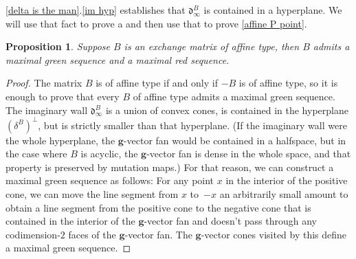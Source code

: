 \documentclass{amsart}
\newtheorem{proposition}{Proposition}[section]
\theoremstyle{definition}
\theoremstyle{remark}
\numberwithin{equation}{section}
\newcommand{\0}{{\mathbf{0}}}
\newcommand{\g}{\mathbf{g}}
\renewcommand{\d}{{\mathfrak d}}
\begin{document}
%
%
%

\cref{delta is the man}.\ref{im hyp} establishes that $\d^B_\infty$ is contained in a hyperplane.
We will use that fact to prove a  and then use that  to prove \cref{affine P point}.

\begin{proposition}\label{aff red}
Suppose $B$ is an exchange matrix of affine type, then $B$ admits a maximal green sequence and a maximal red sequence.
\end{proposition}
\begin{proof}
The matrix $B$ is of affine type if and only if $-B$ is of affine type, so it is enough to prove that every $B$ of affine type admits a maximal green sequence.
The imaginary wall $\d^B_\infty$ is a union of convex cones, is contained in the hyperplane $(\delta^B)^\perp$, but is strictly smaller than that hyperplane.
(If the imaginary wall were the whole hyperplane, the $\g$-vector fan would be contained in a halfspace, but in the case where $B$ is acyclic, the $\g$-vector fan is dense in the whole space, and that property is preserved by mutation maps.) 
For that reason, we can construct a maximal green sequence as follows:
For any point $x$ in the interior of the positive cone, we can move the line segment from $x$ to~$-x$ an arbitrarily small amount to obtain a line segment from the positive cone to the negative cone that is contained in the interior of the $\g$-vector fan and doesn't pass through any codimension-$2$ faces of the $\g$-vector fan.
The $\g$-vector cones visited by this define a maximal green sequence.
\end{proof}
\end{document}
